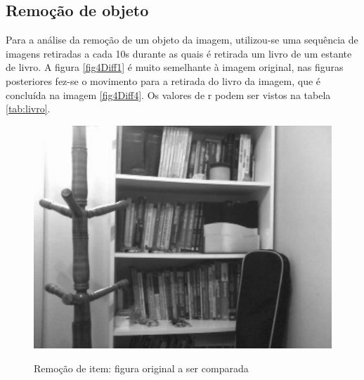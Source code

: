 \documentclass[10pt,a4paper]{article}
\begin{document}
\newpage
\subsection{Remoção de objeto}
Para a análise da remoção de um objeto da imagem, utilizou-se uma
sequência de imagens retiradas a cada 10s durante as quais é retirada
um livro de um estante de livro.
A figura \ref{fig4Diff1} é muito semelhante à imagem original, nas
figuras posteriores fez-se o movimento para a retirada do livro da
imagem, que é concluída na imagem \ref{fig4Diff4}.
Os valores de r podem ser vistos na tabela \ref{tab:livro}.

\begin{figure}[h!]
\begin{center}
\includegraphics[scale=0.25]{photos/livros/gBase} \label{livro}
\caption{Remoção de item: figura original a ser comparada}
\end{center}
\end{figure}
\vspace{-0.5cm}
\end{document}
